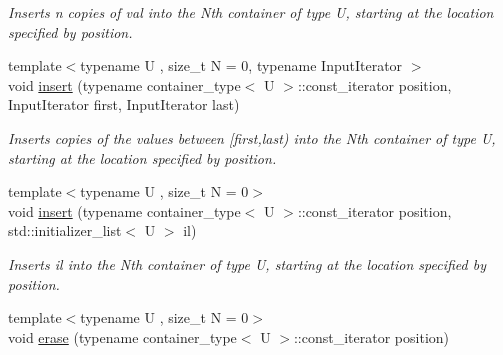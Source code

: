\begin{DoxyCompactItemize}
\begin{DoxyCompactList}\small\item\em Inserts n copies of val into the Nth container of type U, starting at the location specified by position. \end{DoxyCompactList}\item 
\hypertarget{classheterogeneous_1_1heterovector_3_01_t_00_01_types_8_8_8_4_ad397e3241f4a290e8b6b089708a14c7b}{}{\footnotesize template$<$typename U , size\+\_\+t N = 0, typename Input\+Iterator $>$ }\\void \hyperlink{classheterogeneous_1_1heterovector_3_01_t_00_01_types_8_8_8_4_ad397e3241f4a290e8b6b089708a14c7b}{insert} (typename container\+\_\+type$<$ U $>$\+::const\+\_\+iterator position, Input\+Iterator first, Input\+Iterator last)\label{classheterogeneous_1_1heterovector_3_01_t_00_01_types_8_8_8_4_ad397e3241f4a290e8b6b089708a14c7b}

\begin{DoxyCompactList}\small\item\em Inserts copies of the values between \mbox{[}first,last) into the Nth container of type U, starting at the location specified by position. \end{DoxyCompactList}\item 
\hypertarget{classheterogeneous_1_1heterovector_3_01_t_00_01_types_8_8_8_4_a4c0360a58de3869ed498e5bb76e1eccd}{}{\footnotesize template$<$typename U , size\+\_\+t N = 0$>$ }\\void \hyperlink{classheterogeneous_1_1heterovector_3_01_t_00_01_types_8_8_8_4_a4c0360a58de3869ed498e5bb76e1eccd}{insert} (typename container\+\_\+type$<$ U $>$\+::const\+\_\+iterator position, std\+::initializer\+\_\+list$<$ U $>$ il)\label{classheterogeneous_1_1heterovector_3_01_t_00_01_types_8_8_8_4_a4c0360a58de3869ed498e5bb76e1eccd}

\begin{DoxyCompactList}\small\item\em Inserts il into the Nth container of type U, starting at the location specified by position. \end{DoxyCompactList}\item 
\hypertarget{classheterogeneous_1_1heterovector_3_01_t_00_01_types_8_8_8_4_a78f5cd1de9254ac35082a24e440d37c2}{}{\footnotesize template$<$typename U , size\+\_\+t N = 0$>$ }\\void \hyperlink{classheterogeneous_1_1heterovector_3_01_t_00_01_types_8_8_8_4_a78f5cd1de9254ac35082a24e440d37c2}{erase} (typename container\+\_\+type$<$ U $>$\+::const\+\_\+iterator position)\label{classheterogeneous_1_1heterovector_3_01_t_00_01_types_8_8_8_4_a78f5cd1de9254ac35082a24e440d37c2}


\end{DoxyCompactItemize}
